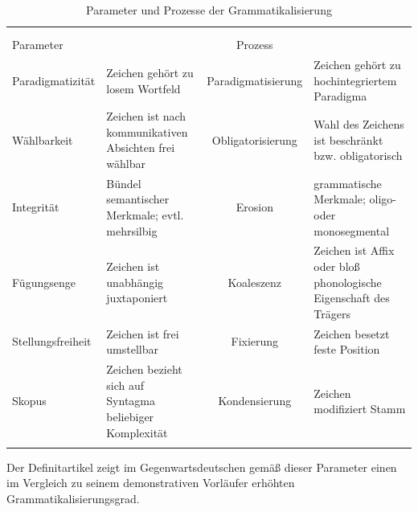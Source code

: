 %
\begin{table}
\centering
\small
\begin{tabular}{
	l
	>{\raggedright}p{}
	c
	>{\raggedright\arraybackslash}p{}
}
\lsptoprule
& \multicolumn{3}{c}{{Grammatikalisierungsgrad}}\\
                   & \multicolumn{1}{c}{{niedrig}}& & \multicolumn{1}{c}{{hoch}}\\
\cmidrule(lr){2-4}
{Parameter} & & {Prozess}   &                   \\ \midrule
{Paradigmatizität}            & Zeichen gehört zu losem Wortfeld                         & Paradigmatisierung & Zeichen gehört zu hochintegriertem Paradigma                     \\
{Wählbarkeit}                 & Zeichen ist nach kommunikativen Absichten frei wählbar   & Obligatorisierung  & Wahl des Zeichens ist beschränkt bzw. obligatorisch              \\
{Integrität}                  & Bündel semantischer Merkmale; evtl. mehrsilbig           & Erosion            & grammatische Merkmale; oligo- oder monosegmental                 \\
{Fügungsenge}                 & Zeichen ist unabhängig juxtaponiert                      & Koaleszenz         & Zeichen ist Affix oder bloß phonologische Eigenschaft des Trägers \\
{Stellungsfreiheit}           & Zeichen ist frei umstellbar                              & Fixierung          & Zeichen besetzt feste Position                                   \\
{Skopus}                      & Zeichen bezieht sich auf Syntagma beliebiger Komplexität & Kondensierung      & Zeichen modifiziert Stamm                                        \\ \lspbottomrule
\end{tabular}
\caption{Parameter und Prozesse der Grammatikalisierung \parencite[1255]{Lehmann1995}}
\label{tab:lehmann-parameter-prozess}
\end{table}

 
Der Definitartikel zeigt im Gegenwartsdeutschen gemäß dieser Parameter einen im Vergleich zu seinem demonstrativen Vorläufer erhöhten Grammatikalisierungsgrad. 

